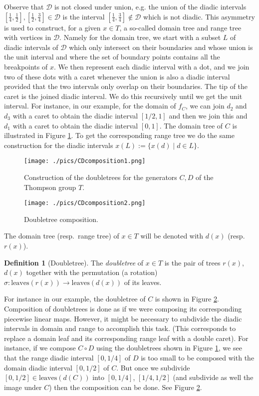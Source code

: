 \documentclass{amsart}
\newcommand{\fD}{\mathcal D}
\theoremstyle{definition}
\newtheorem{defn}[thm]{Definition}  %
\begin{document}
Observe that $\fD$ is not closed under union, e.g. the union of the diadic intervals $[\frac14,\frac12],[\frac12,\frac34]\in\fD$ is the interval $[\frac14,\frac34]\not\in\fD$ which is not diadic. 
This asymmetry is used to construct, for a given $x\in T$, a so-called domain tree and range tree with vertices in $\fD$. Namely for the domain tree, we start with a subset $L$ of diadic intervals of $\fD$ which only intersect on their boundaries and whose union is the unit interval and where the set of boundary points contains all the breakpoints of $x$. We then represent each diadic interval with a dot, and we join two of these dots with a caret whenever the union is also a diadic interval provided that the two intervals only overlap on their boundaries. The tip of the caret is the joined diadic interval. We do this recursively until we get the unit interval. For instance, in our example, for the domain of $f_C$, we can join $d_2$ and $d_3$ with a caret to obtain the diadic interval $[1/2,1]$ and then we join this and $d_1$ with a caret to obtain the diadic interval $[0,1]$. The domain tree of $C$ is illustrated in Figure \ref{f:CDcomposition1}. To get the corresponding range tree we do the same construction for the diadic intervals $x(L):=\{x(d)\mid d\in L\}$.
\begin{figure}
\texttt{[image: ./pics/CDcomposition1.png]}
  \caption{Construction of the doubletrees for the generators $C,D$ of the Thompson group $T$.}\label{f:CDcomposition1}
\end{figure}
\begin{figure}
\texttt{[image: ./pics/CDcomposition2.png]}
  \caption{Doubletree composition.}\label{f:CDcomposition2}
\end{figure}

The domain tree (resp.~range tree) of $x\in T$ will be denoted with $d(x)$ (resp.~$r(x)$).
\begin{defn}[Doubletree]
The \emph{doubletree} of $x\in T$ is the pair of trees $r(x)$, $d(x)$ together with the permutation (a rotation)  
$\sigma:\mathrm{leaves}(r(x))\to \mathrm{leaves}(d(x))$
of its leaves.
\end{defn}
For instance in our example, the doubletree of $C$ is shown in Figure \ref{f:CDcomposition2}.
Composition of doubletrees is done as if we were composing its corresponding piecewise linear maps. 
However, it might be necessary to subdivide the diadic intervals in domain and range to accomplish this task. 
(This corresponds to replace  a domain leaf and its corresponding range leaf with a double caret).
For instance, if we compose  $C\circ D$ using the doubletrees shown in Figure \ref{f:CDcomposition1}, we see that the range diadic interval $[0,1/4]$ of $D$ is too small to be composed with the domain diadic interval $[0,1/2]$ of $C$. But once we subdivide  $[0,1/2]\in \mathrm{leaves}(d(C))$  into $[0,1/4]$, $[1/4,1/2]$ (and subdivide as well the image under $C$) then the composition can be done. See Figure \ref{f:CDcomposition2}.
\end{document}
